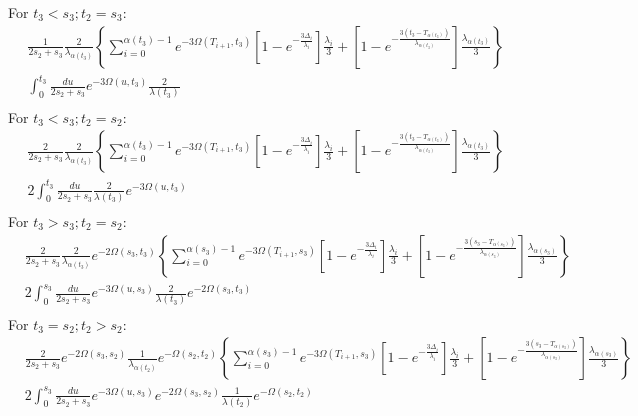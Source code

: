 \documentclass{article}
\begin{document}
For $t_3<s_3; t_2=s_3$:
\begin{align*}
    &\frac{1}{2s_2+s_3}\frac{2}{\lambda_{\alpha(t_3)}}
    \left\{\sum_{i=0}^{\alpha(t_3)-1}e^{-3\Omega(T_{i+1},t_3)}
        \left[1-e^{-\frac{3\Delta_i}{\lambda_i}}\right]\frac{\lambda_i}{3}+
    \left[1-e^{-\frac{3\left(t_3-T_{\alpha(t_3)}\right)}{\lambda_{\alpha(t_3)}}}\right]
        \frac{\lambda_{\alpha(t_3)}}{3}\right\}\\
    &\int_0^{t_3}\frac{du}{2s_2+s_3}e^{-3\Omega(u,t_3)}\frac{2}{\lambda(t_3)}\\
\end{align*}
For $t_3<s_3; t_2=s_2$:
\begin{align*}
    &\frac{2}{2s_2+s_3}\frac{2}{\lambda_{\alpha(t_3)}}
    \left\{\sum_{i=0}^{\alpha(t_3)-1}e^{-3\Omega(T_{i+1},t_3)}
        \left[1-e^{-\frac{3\Delta_i}{\lambda_i}}\right]\frac{\lambda_i}{3}+
    \left[1-e^{-\frac{3\left(t_3-T_{\alpha(t_3)}\right)}{\lambda_{\alpha(t_3)}}}\right]
        \frac{\lambda_{\alpha(t_3)}}{3}\right\}\\
    &2\int_0^{t_3}\frac{du}{2s_2+s_3}\frac{2}{\lambda(t_3)}e^{-3\Omega(u,t_3)}\\
\end{align*}
For $t_3>s_3; t_2=s_2$:
\begin{align*}
    &\frac{2}{2s_2+s_3}\frac{2}{\lambda_{\alpha(t_3)}}e^{-2\Omega(s_3,t_3)}
    \left\{\sum_{i=0}^{\alpha(s_3)-1}e^{-3\Omega(T_{i+1},s_3)}
        \left[1-e^{-\frac{3\Delta_i}{\lambda_i}}\right]\frac{\lambda_i}{3}+
    \left[1-e^{-\frac{3\left(s_3-T_{\alpha(s_3)}\right)}{\lambda_{\alpha(s_3)}}}\right]
        \frac{\lambda_{\alpha(s_3)}}{3}\right\}\\
    &2\int_0^{s_3}\frac{du}{2s_2+s_3}e^{-3\Omega(u,s_3)}\frac{2}{\lambda(t_3)}e^{-2\Omega(s_3,t_3)}\\
\end{align*}
For $t_3=s_2; t_2>s_2$:
\begin{align*}
    &\frac{2}{2s_2+s_3}e^{-2\Omega(s_3,s_2)}\frac{1}{\lambda_{\alpha(t_2)}}e^{-\Omega(s_2,t_2)}
    \left\{\sum_{i=0}^{\alpha(s_3)-1}e^{-3\Omega(T_{i+1},s_3)}
        \left[1-e^{-\frac{3\Delta_i}{\lambda_i}}\right]\frac{\lambda_i}{3}+
    \left[1-e^{-\frac{3\left(s_3-T_{\alpha(s_3)}\right)}{\lambda_{\alpha(s_3)}}}\right]
        \frac{\lambda_{\alpha(s_3)}}{3}\right\}\\
    &2\int_0^{s_3}\frac{du}{2s_2+s_3}e^{-3\Omega(u,s_3)}e^{-2\Omega(s_3,s_2)}\frac{1}{\lambda(t_2)}e^{-\Omega(s_2,t_2)}
\end{align*}
\end{document}
